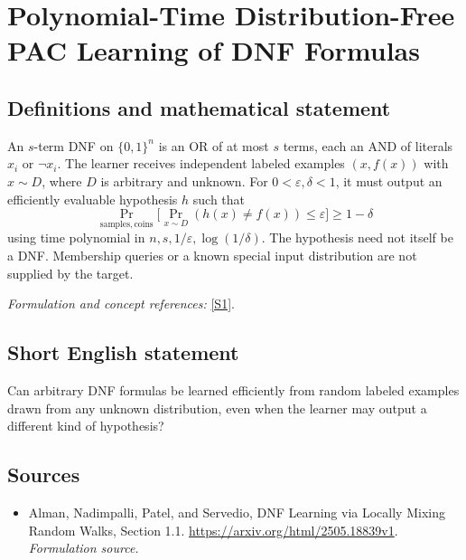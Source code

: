 \documentclass[11pt]{article}
\begin{document}
\section*{\texorpdfstring{Polynomial-Time Distribution-Free PAC Learning of DNF Formulas}{Polynomial-Time Distribution-Free PAC Learning of DNF Formulas}}\label{219}
\subsection{Definitions and mathematical statement}
An $s$-term DNF on $\{0,1\}^n$ is an OR of at most $s$ terms, each an AND of literals $x_i$ or $\neg x_i$. The learner receives independent labeled examples $(x,f(x))$ with $x\sim D$, where $D$ is arbitrary and unknown. For $0<{\varepsilon},\delta<1$, it must output an efficiently evaluable hypothesis $h$ such that
\[
 \Pr_{\mathrm{samples,coins}}\bigl[\Pr_{x\sim D}(h(x)\ne f(x))\le{\varepsilon}\bigr]\ge1-\delta
\]
using time polynomial in $n,s,1/{\varepsilon},\log(1/\delta)$. The hypothesis need not itself be a DNF. Membership queries or a known special input distribution are not supplied by the target.
\par\smallskip\textit{Formulation and concept references:} \href{https://arxiv.org/html/2505.18839v1}{[S1]}.

\subsection{Short English statement}
Can arbitrary DNF formulas be learned efficiently from random labeled examples drawn from any unknown distribution, even when the learner may output a different kind of hypothesis?
\subsection{Sources}
\begin{itemize}
\item[S1]Alman, Nadimpalli, Patel, and Servedio, DNF Learning via Locally Mixing Random Walks, Section 1.1.
\url{https://arxiv.org/html/2505.18839v1}.
\textit{Formulation source.}
\end{itemize}
\end{document}
